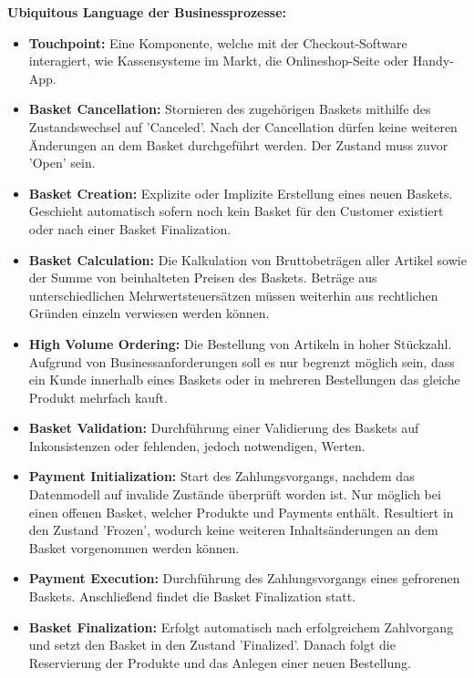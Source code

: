 \pagebreak

{\large \textbf{Ubiquitous Language der Businessprozesse:}}
\begin{itemize}[topsep=-3px]
	\item \textbf{Touchpoint: } { Eine Komponente, welche mit der Checkout-Software interagiert, wie Kassensysteme im Markt, die Onlineshop-Seite oder Handy-App.}
	\item \textbf{Basket Cancellation: } {Stornieren des zugehörigen Baskets mithilfe des Zustandswechsel auf 'Canceled'. Nach der Cancellation dürfen keine weiteren Änderungen an dem Basket durchgeführt werden. Der Zustand muss zuvor 'Open' sein. }
	\item \textbf{Basket Creation: } {Explizite oder Implizite Erstellung eines neuen Baskets. Geschieht automatisch sofern noch kein Basket für den Customer existiert oder nach einer Basket Finalization.}
	\item \textbf{Basket Calculation: } {Die Kalkulation von Bruttobeträgen aller Artikel sowie der Summe von beinhalteten Preisen des Baskets. Beträge aus unterschiedlichen Mehrwertsteuersätzen müssen weiterhin aus rechtlichen Gründen einzeln verwiesen werden können.}
	\item \textbf{High Volume Ordering: } {Die Bestellung von Artikeln in hoher Stückzahl. Aufgrund von Businessanforderungen soll es nur begrenzt möglich sein, dass ein Kunde innerhalb eines Baskets oder in mehreren Bestellungen das gleiche Produkt mehrfach kauft.}
	\item \textbf{Basket Validation: } {Durchführung einer Validierung des Baskets auf Inkonsistenzen oder fehlenden, jedoch notwendigen, Werten.}
	\item \textbf{Payment Initialization: } {Start des Zahlungsvorgangs, nachdem das Datenmodell auf invalide Zustände überprüft worden ist. Nur möglich bei einen offenen Basket, welcher Produkte und Payments enthält. Resultiert in den Zustand 'Frozen', wodurch keine weiteren Inhaltsänderungen an dem Basket vorgenommen werden können.}
	\item \textbf{Payment Execution: } {Durchführung des Zahlungsvorgangs eines gefrorenen Baskets. Anschließend findet die Basket Finalization statt.}
	\item \textbf{Basket Finalization: } {Erfolgt automatisch nach erfolgreichem Zahlvorgang und setzt den Basket in den Zustand 'Finalized'. Danach folgt die Reservierung der Produkte und das Anlegen einer neuen Bestellung.}
\end{itemize}
\vspace{2em}


